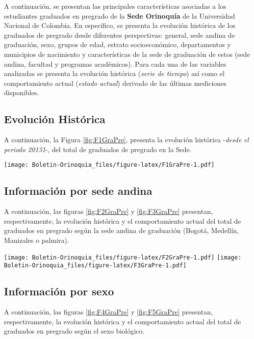\documentclass[
]{book}
\begin{document}
A continuación, se presentan las principales características asociadas a los estudiantes graduados en pregrado de la \textbf{Sede Orinoquía} de la Universidad Nacional de Colombia. En específico, se presenta la evolución histórica de los graduados de pregrado desde diferentes perspectivas: general, sede andina de graduación, sexo, grupos de edad, estrato socioeconómico, departamentos y municipios de nacimiento y características de la sede de graduación de estos (sede andina, facultad y programas académicos). Para cada una de las variables analizadas se presenta la evolución histórica (\emph{serie de tiempo}) así como el comportamiento actual (\emph{estado actual}) derivado de las últimas mediciones disponibles.

\hypertarget{evoluciuxf3n-histuxf3rica-5}{%
\subsection{Evolución Histórica}\label{evoluciuxf3n-histuxf3rica-5}}

A continuación, la Figura \ref{fig:F1GraPre}, presenta la evolución histórica -\emph{desde el periodo 20131}-, del total de graduados de pregrado en la Sede.

\texttt{[image: Boletin-Orinoquia\_files/figure-latex/F1GraPre-1.pdf]}

\hypertarget{informaciuxf3n-por-sede-andina-3}{%
\subsection{Información por sede andina}\label{informaciuxf3n-por-sede-andina-3}}

A continuación, las figuras \ref{fig:F2GraPre} y \ref{fig:F3GraPre} presentan, respectivamente, la evolución histórica y el comportamiento actual del total de graduados en pregrado según la sede andina de graduación (Bogotá, Medellín, Manizales o palmira).

\texttt{[image: Boletin-Orinoquia\_files/figure-latex/F2GraPre-1.pdf]}
\texttt{[image: Boletin-Orinoquia\_files/figure-latex/F3GraPre-1.pdf]}

\hypertarget{informaciuxf3n-por-sexo-5}{%
\subsection{Información por sexo}\label{informaciuxf3n-por-sexo-5}}

A continuación, las figuras \ref{fig:F4GraPre} y \ref{fig:F5GraPre} presentan, respectivamente, la evolución histórica y el comportamiento actual del total de graduados en pregrado según el sexo biológico.
\end{document}
